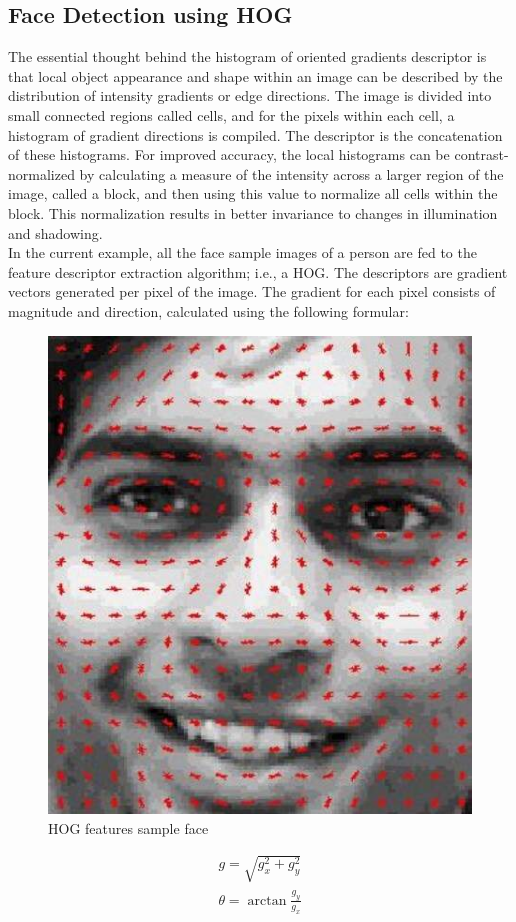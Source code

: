     \subsection{Face Detection using HOG}
        The essential thought behind the histogram of oriented gradients descriptor is that local object appearance and shape within an image can be described by the distribution of intensity gradients or edge directions. 
        The image is divided into small connected regions called cells, and for the pixels within each cell, a histogram of gradient directions is compiled. The descriptor is the concatenation of these histograms. For 
        improved accuracy, the local histograms can be contrast-normalized by calculating a measure of the intensity across a larger region of the image, called a block, and then using this value to normalize all cells 
        within the block. This normalization results in better invariance to changes in illumination and shadowing. \\
        \vspace{3mm}
        In the current example, all the face sample images of a person are fed to the feature descriptor extraction algorithm; i.e., a HOG. The descriptors are gradient vectors generated per pixel of the image. 
        The gradient for each pixel consists of magnitude and direction, calculated using the following formular:
        \begin{figure}[H]
            \centering
            \includegraphics[width=0.6\linewidth]{img/HOG-feature.jpg}
            \caption{HOG features sample face}
        \end{figure}
        \begin{align}
            g = \sqrt{g^2_x + g^2_y} \\ 
            \theta = \arctan{\frac{g_y}{g_x}}
        \end{align}
